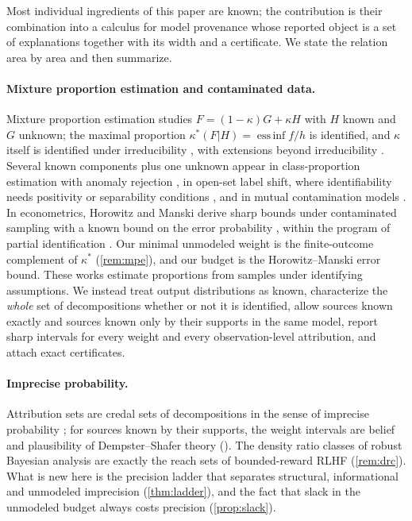 \documentclass[11pt]{article}
\theoremstyle{definition}
\theoremstyle{remark}
\begin{document}
Most individual ingredients of this paper are known; the contribution is their combination into a
calculus for model provenance whose reported object is a set of explanations together with its width
and a certificate. We state the relation area by area and then summarize.

\paragraph{Mixture proportion estimation and contaminated data.} Mixture proportion estimation studies
$F=(1-\kappa)G+\kappa H$ with $H$ known and $G$ unknown; the maximal proportion
$\kappa^*(F|H)=\operatorname{ess\,inf}f/h$ is identified, and $\kappa$ itself is identified under
irreducibility \cite{Blanchard2010,Scott2015}, with extensions beyond irreducibility \cite{Zhu2023}.
Several known components plus one unknown appear in class-proportion estimation with anomaly rejection
\cite{SandersonScott2014}, in open-set label shift, where identifiability needs positivity or
separability conditions \cite{Garg2022}, and in mutual contamination models \cite{BlanchardScott2014}.
In econometrics, Horowitz and Manski derive sharp bounds under contaminated sampling with a known
bound on the error probability \cite{HorowitzManski1995}, within the program of partial
identification \cite{Manski2003}. Our minimal unmodeled weight is the finite-outcome complement of
$\kappa^*$ (\cref{rem:mpe}), and our budget is the Horowitz--Manski error bound. These works estimate
proportions from samples under identifying assumptions. We instead treat output distributions as
known, characterize the \emph{whole} set of decompositions whether or not it is identified, allow
sources known exactly and sources known only by their supports in the same model, report sharp
intervals for every weight and every observation-level attribution, and attach exact certificates.

\paragraph{Imprecise probability.} Attribution sets are credal sets of decompositions in the sense of
imprecise probability \cite{Walley1991}; for sources known by their supports, the weight intervals are
belief and plausibility of Dempster--Shafer theory \cite{Dempster1967,Shafer1976}
(\cite[Prop.~5.8]{Awasthi-Tower}). The density ratio classes of robust Bayesian analysis
\cite{DeRobertisHartigan1981} are exactly the reach sets of bounded-reward RLHF (\cref{rem:drc}). What
is new here is the precision ladder that separates structural, informational and unmodeled
imprecision (\cref{thm:ladder}), and the fact that slack in the unmodeled budget always costs precision
(\cref{prop:slack}).
\end{document}
